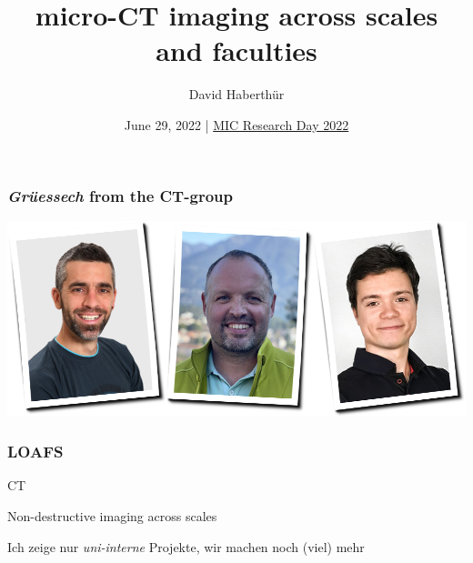 \documentclass[aspectratio=169]{beamer}
\title{micro-CT imaging across scales and faculties}
\author{David Haberthür}
\date{June 29, 2022 | \href{https://www.mic.unibe.ch/events/mic_research_day_2022}{MIC Research Day 2022}}
\newcommand{\uct}{\textmu CT\xspace}%
\begin{document}
{%
	\begin{frame}%
		\maketitle
	\end{frame}%
}

\begin{frame}
	\frametitle{\emph{Grüessech} from the \uct-group}
	\centering
	\includegraphics[width=\linewidth]{./images/team}
\end{frame}

\begin{frame}
	\frametitle{LOAFS}
	\uct
	
	Non-destructive imaging across scales
	
	Ich zeige nur \emph{uni-interne} Projekte, wir machen noch (viel) mehr	
\end{frame}
\end{document}
